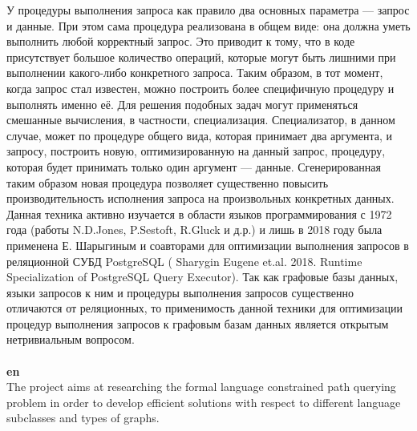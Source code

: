 \documentclass[12pt]{article}  %
\theoremstyle{remark}
\begin{document}
У процедуры выполнения запроса как правило два основных параметра --- запрос и данные.
При этом сама процедура реализована в общем виде: она должна уметь выполнить любой корректный запрос.
Это приводит к тому, что в коде присутствует большое количество операций, которые могут быть лишними при выполнении какого-либо конкретного запроса.
Таким образом, в тот момент, когда запрос стал известен, можно построить более специфичную процедуру и выполнять именно её.
Для решения подобных задач могут применяться смешанные вычисления, в частности, специализация.
Специализатор, в данном случае, может по процедуре общего вида, которая принимает два аргумента, и запросу, построить новую, оптимизированную на данный запрос, процедуру, которая будет принимать только один аргумент --- данные. Сгенерированная таким образом новая процедура позволяет существенно повысить производительность исполнения запроса на произвольных конкретных данных.
Данная техника активно изучается в области языков программирования с 1972 года (работы N.D.Jones, P.Sestoft, R.Gluck и д.р.) и лишь в 2018 году была применена Е. Шарыгиным и соавторами для оптимизации выполнения запросов в реляционной СУБД PostgreSQL ( Sharygin Eugene et.al. 2018. Runtime Specialization of PostgreSQL Query Executor). Так как графовые базы данных, языки запросов к ним и процедуры выполнения запросов существенно отличаются от реляционных, то применимость данной техники для оптимизации процедур выполнения запросов к графовым базам данных является открытым нетривиальным вопросом.
\\
\\
\textbf{en}\\


The project aims at researching the formal language constrained path querying problem in order to develop efficient solutions with respect to different language subclasses and types of graphs.
\end{document}
